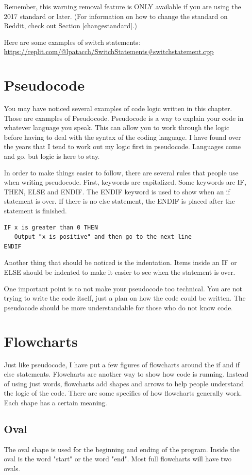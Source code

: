 Remember, this warning removal feature is ONLY available if you are using the 2017 standard or later. (For information on how to change the standard on Reddit, check out Section \ref{changestandard}.)


Here are some examples of switch statements: 
\url{https://replit.com/@lpatacch/SwitchStatements#switchstatement.cpp}
\section{Pseudocode}
You may have noticed several examples of code 
logic written in this chapter. Those are examples of Pseudocode.
Pseudocode is a way to explain your code in whatever language you speak. This can allow
you to work through the logic before having to
deal with the syntax of the coding language. I
have found over the years that I tend to work
out my logic first in pseudocode. Languages come and go, but logic is here to stay.

In order to make things easier to follow, there
are several rules that people use when writing
pseudocode. First, keywords are capitalized. Some keywords are IF, THEN, ELSE and ENDIF. The ENDIF
keyword is used to show when an if statement is over. If there is no else statement, the ENDIF
is placed after the statement is finished. 
\begin{verbatim}
IF x is greater than 0 THEN
   Output "x is positive" and then go to the next line
ENDIF
\end{verbatim}
Another thing that should be noticed is the indentation. Items inside an IF or ELSE should
be indented to make it easier to see when the statement is over.

One important point is to not make your pseudocode too technical. You are not trying to write the code itself, just a plan on how the code could be written. The pseudocode should be more understandable for those who do not know code.

\section{Flowcharts}
Just like pseudocode, I have put a few figures of flowcharts around the if and if else statements. Flowcharts are another way to show how code is running. Instead of using just words, flowcharts add shapes and arrows to help people understand the logic of the code. There are some specifics of how flowcharts generally work. Each shape has a certain meaning.
\subsection{Oval}
The oval shape is used for the beginning and
ending of the program. Inside the oval is the word "start" or the word "end". Most full flowcharts will have two ovals.

